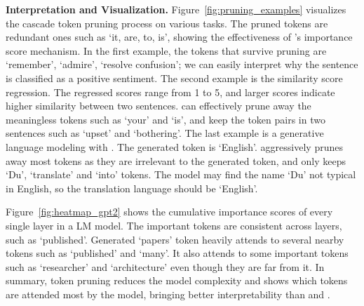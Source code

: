 \textbf{Interpretation and Visualization.}
Figure~\ref{fig:pruning_examples} visualizes the cascade token pruning process on various tasks. The pruned tokens are redundant ones such as `it, are, to, is', showing the effectiveness of \name's importance score mechanism. 
In the first example, the tokens that survive pruning are `remember', `admire', `resolve confusion'; we can easily interpret why the sentence is classified as a positive sentiment.
The second example is the similarity score regression. The regressed scores range from 1 to 5, and larger scores indicate higher similarity between two sentences. \name can effectively prune away the meaningless tokens such as `your' and `is', and keep the token pairs in two sentences such as `upset' and `bothering'.
The last example is a generative language modeling with \gpttwo. The generated token is `English'. \name aggressively prunes away most tokens as they are irrelevant to the generated token, and only keeps `Du', `translate' and `into' tokens. The model may find the name `Du' not typical in English, so the translation language should be `English'.



Figure~\ref{fig:heatmap_gpt2} shows the cumulative importance scores of every single layer in a \gpttwo LM model. The important tokens are consistent across layers, such as `published'. Generated `papers' token heavily attends to several nearby tokens such as `published' and `many'. It also attends to some important tokens such as `researcher' and `architecture' even though they are far from it. In summary, token pruning reduces the model complexity and shows which tokens are attended most by the model, bringing better interpretability than \athree and \mnnfast.









